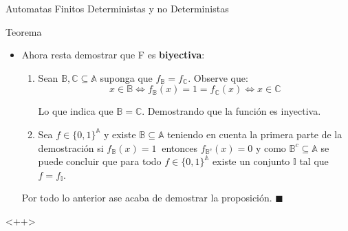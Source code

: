 \documentclass[a4paper]{book}
\begin{document}
\begin{chapter}{Automatas Finitos Deterministas y no Deterministas}
\begin{theorem}{Teorema}
\begin{itemize}
                \item Ahora resta demostrar que F es \textbf{biyectiva}:

                    \begin{enumerate}[{1) }]
                        \item Sean $\mathbb B,\mathbb C\subseteq\mathbb A$
                            suponga que $f_{\mathbb B}=f_{\mathbb C}$. Observe
                            que:
                            \begin{equation*}
                            \label{eq:1.3}
                                x\in\mathbb B \iff f_{\mathbb
                                B}\left(x\right)=1=f_{\mathbb C}\left(x\right)
                                \iff x\in\mathbb C
                            \end{equation*}

                            Lo que indica que $\mathbb B=\mathbb C$.
                            Demostrando que la función es inyectiva.

                        \item Sea $f\in\{0,1\}^{\mathbb A}$ y existe $\mathbb
                            B\subseteq\mathbb A$ teniendo en cuenta la primera
                            parte de la demostración si $f_{\mathbb B}(x) = 1\
                            $ entonces $f_{\mathbb B^{c}}(x)=0$ y como $\mathbb
                            B^{c}\subseteq\mathbb A$ se puede concluir que para
                            todo $f\in\{0,1\}^{\mathbb A}$ existe un conjunto
                            $\mathbb I$ tal que $f=f_{\mathbb I}$.
                    \end{enumerate}
                Por todo lo anterior ase acaba de demostrar la proposición. $\blacksquare$
        \end{itemize}
    \end{theorem}

    <++>






















    \end{chapter}






    \printbibliography
\end{document}
